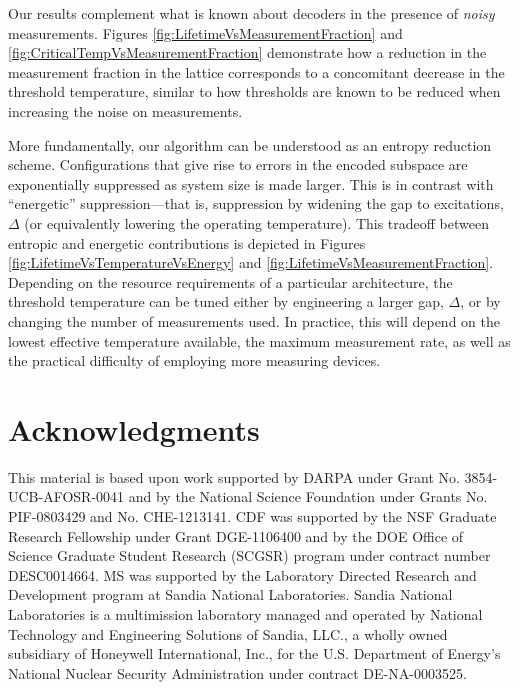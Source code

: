 \documentclass[twocolumn,superscriptaddress,aps,prb,floatfix]{revtex4-1}
\begin{document}
Our results complement what is known about decoders in the presence of \emph{noisy} measurements.  Figures \ref{fig:LifetimeVsMeasurementFraction} and \ref{fig:CriticalTempVsMeasurementFraction} demonstrate how a reduction in the measurement fraction in the lattice corresponds to a concomitant decrease in the threshold temperature, similar to how thresholds are known to be reduced when increasing the noise on measurements.

More fundamentally, our algorithm can be understood as an entropy reduction scheme.  Configurations that give rise to errors in the encoded subspace are exponentially suppressed as system size is made larger.  This is in contrast with ``energetic'' suppression---that is, suppression by widening the gap to excitations, $\Delta$ (or equivalently lowering the operating temperature).  This tradeoff between entropic and energetic contributions is depicted in Figures \ref{fig:LifetimeVsTemperatureVsEnergy} and \ref{fig:LifetimeVsMeasurementFraction}.  Depending on the resource requirements of a particular architecture, the threshold temperature can be tuned either by engineering a larger gap, $\Delta$, or by changing the number of measurements used.  In practice, this will depend on the lowest effective temperature available, the maximum measurement rate, as well as the practical difficulty of employing more measuring devices.



\section{Acknowledgments}
This material is based upon work supported by DARPA under Grant No. 3854-UCB-AFOSR-0041 and by the National Science Foundation under Grants No. PIF-0803429 and No. CHE-1213141.  CDF was supported by the NSF Graduate Research Fellowship under Grant DGE-1106400 and by the DOE Office of Science Graduate Student Research (SCGSR) program under contract number DESC0014664. MS was supported by the Laboratory Directed Research and Development program at Sandia National Laboratories.  Sandia National Laboratories is a multimission laboratory managed and operated by National Technology and Engineering Solutions of Sandia, LLC., a wholly owned subsidiary of Honeywell International, Inc., for the U.S. Department of Energy's National Nuclear Security Administration under contract DE-NA-0003525.



\appendix
\end{document}
